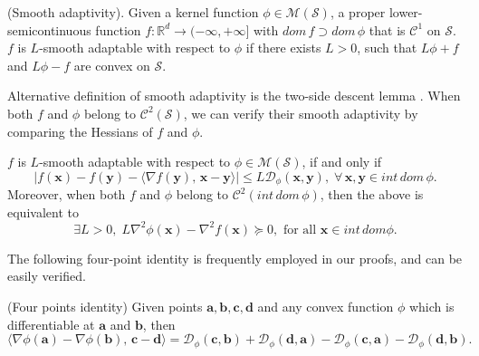 \documentclass[twoside,11pt]{article}
\newcommand{\R}{\mathbb R}
\newcommand{\cC}{\mathcal C}
\newcommand{\cD}{\mathcal D}
\newcommand{\cM}{\mathcal M}
\newcommand{\cS}{\mathcal S}
\def\inprod#1#2{\langle#1,\,#2\rangle}
\def\va{{\bm{a}}}
\def\vb{{\bm{b}}}
\def\vc{{\bm{c}}}
\def\vd{{\bm{d}}}
\def\vx{{\bm{x}}}
\def\vy{{\bm{y}}}
\begin{document}
\begin{definition}\label{relative-smooth-def}
 (Smooth adaptivity). Given a kernel function $\phi\in\cM(\cS)$, 
 a proper lower-semicontinuous function $f:\R^d\rightarrow(-\infty,+\infty]$ with $dom\,f\supset dom\,\phi $ that  is $\cC^1$ on $\cS$. $f$ is $L$-smooth adaptable with respect to $\phi$ if there exists $L>0$, such that $L\phi+f$ and $L\phi-f$ are convex on $\cS$.
\end{definition}
Alternative definition of smooth adaptivity is the two-side descent lemma \cite[Lemma 2.1]{bolte2018first}. When both $f$ and $\phi$ belong to $\cC^2(\cS)$, we can verify their smooth adaptivity by comparing the Hessians of $f$ and $\phi$.
\begin{lemma}\label{two-side-descent}
$f$ is $L$-smooth adaptable with respect to $\phi\in\cM(\cS)$, if and only if 
\[
|f(\vx)-f(\vy)-\inprod{\nabla f(\vy)}{\vx-\vy}|\leq L\cD_\phi(\vx,\vy),\;\forall\,\vx,\vy\in int\,dom\,\phi.
\]
Moreover, when both $f$ and $\phi$ {belong to} $\cC^2(int\,dom\,\phi)$, then the above is equivalent to
\[
\exists L>0,\;L \nabla^2\phi(\vx)-\nabla^2f(\vx) \succeq 0, \text { for all } \vx \in int\,dom\phi.
\]
\end{lemma}
The following four-point identity is frequently employed in our proofs, and can be easily verified.
\begin{lemma}(Four points identity) 
Given points $\va,\vb,\vc,\vd$ and any convex function $\phi$ which is differentiable at $\va$ and $\vb$, then
\[
\inprod{\nabla\phi(\va)-\nabla\phi(\vb)}{\vc-\vd}=\cD_\phi(\vc,\vb)+\cD_\phi(\vd,\va)-\cD_\phi(\vc,\va)-\cD_\phi(\vd,\vb).
\]
\label{four-point-identity}
\end{lemma}
\end{document}
